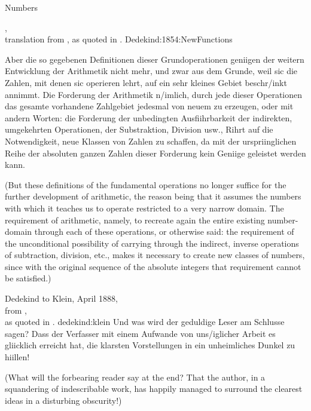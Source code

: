 \begin{plSection}{Numbers}
\label{sec:Numbers}


\begin{plQuote}
{,\\
translation from ,
as quoted in .}
{Dedekind:1854:NewFunctions}
{
{Aber die so gegebenen Definitionen dieser Grundoperationen
geniigen der weitern Entwicklung der Arithmetik nicht mehr, 
und zwar aus dem Grunde, weil sic
die Zahlen, mit denen sic operieren lehrt, auf ein sehr kleines 
Gebiet beschr/inkt annimmt. Die
Forderung der Arithmetik n/imlich, durch jede dieser Operationen 
das gesamte vorhandene Zahlgebiet
jedesmal von neuem zu erzeugen, oder mit andern Worten: 
die Forderung der unbedingten
Ausfiihrbarkeit der indirekten, umgekehrten Operationen, 
der Substraktion, Division usw., Rihrt
auf die Notwendigkeit, neue Klassen von Zahlen zu schaffen, 
da mit der urspriinglichen Reihe
der absoluten ganzen Zahlen 
dieser Forderung kein Geniige geleistet werden kann.}
\par
(But these definitions of the fundamental operations 
no longer suffice for the further development
of arithmetic, the reason being that it assumes the numbers with 
which it teaches us
to operate restricted to a very narrow domain. The requirement of 
arithmetic, namely, to
recreate again the entire existing number-domain through each 
of these operations, or otherwise
said: the requirement of the unconditional possibility 
of carrying through the indirect,
inverse operations of subtraction, division, etc., 
makes it necessary to create new classes of
numbers, since with the original sequence 
of the absolute integers that requirement cannot be
satisfied.)}%
\end{plQuote}

\begin{plQuote}
{Dedekind to Klein, April 1888,\\ 
from ,\\
as quoted in .}
{dedekind:klein}
{Und was wird der geduldige Leser am
Schlusse sagen? Dass der Verfasser mit einem Aufwande von uns/iglicher Arbeit es gliicklich
erreicht hat, die klarsten Vorstellungen in ein unheimliches Dunkel zu hiillen!}
\par
(What will the forbearing reader say at the end? That the author, in a squandering of indescribable
work, has happily managed to surround the clearest ideas in a disturbing obscurity!)%
\end{plQuote}


\end{plSection}
